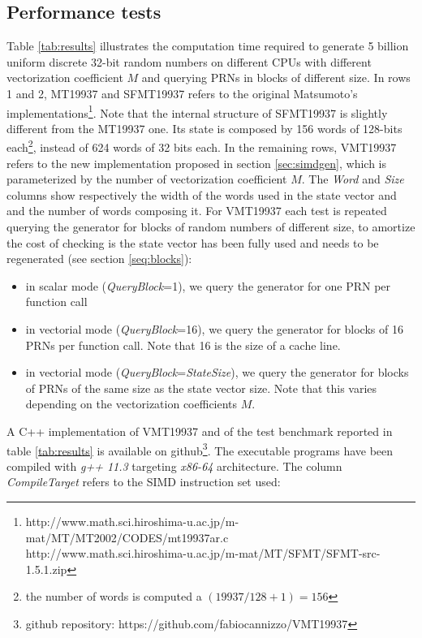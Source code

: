 \documentclass[preprint,1p,times]{elsarticle}
\begin{document}
			\subsection{Performance tests}
			\label{sec:tests}
			Table \ref{tab:results} illustrates the computation time required to generate 5 billion uniform discrete 32-bit random numbers on different CPUs with different vectorization coefficient $M$ and querying PRNs in blocks of different size.
			In rows 1 and 2, MT19937 and SFMT19937 refers to the original Matsumoto's implementations\footnote{\label{fn:orig}http://www.math.sci.hiroshima-u.ac.jp/m-mat/MT/MT2002/CODES/mt19937ar.c \\ http://www.math.sci.hiroshima-u.ac.jp/m-mat/MT/SFMT/SFMT-src-1.5.1.zip}. Note that the internal structure of SFMT19937 is slightly different from the MT19937 one. Its state is composed by 156 words of 128-bits each\footnote{the number of words is computed a $(19937 / 128 + 1)=156$}, instead of 624 words of 32 bits each.
			In the remaining rows, VMT19937 refers to the new implementation proposed in section \ref{sec:simdgen}, which is parameterized by the number of vectorization coefficient $M$.
			The \textit{Word} and \textit{Size} columns show respectively the width of the words used in the state vector and and the number of words composing it.
			For VMT19937 each test is repeated querying the generator for blocks of random numbers of different size, to amortize the cost of checking is the state vector has been fully used and needs to be regenerated (see section \ref{seq:blocks}): 
			\begin{itemize}
				\item in scalar mode (\textit{QueryBlock}=1), we query the generator for one PRN per function call
				\item in vectorial mode (\textit{QueryBlock}=16), we query the generator for blocks of 16 PRNs per function call. Note that 16 is the size of a cache line.
				\item in vectorial mode (\textit{QueryBlock}=\textit{StateSize}), we query the generator for blocks of PRNs of the same size as the state vector size. Note that this varies depending on the vectorization coefficients $M$.
			\end{itemize}
			A C++ implementation of VMT19937 and of the test benchmark reported in table \ref{tab:results} is available on github\footnote{github repository: https://github.com/fabiocannizzo/VMT19937}. The executable programs have been compiled with \textit{g++ 11.3} targeting \textit{x86-64} architecture. The column \textit{CompileTarget} refers to the SIMD instruction set used:
\end{document}
